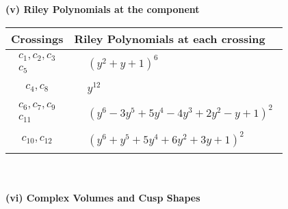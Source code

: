 \documentclass[1p]{elsarticle_modified}
\theoremstyle{definition}
\begin{document}
\newpage\renewcommand{\arraystretch}{1}
\flushleft \textbf{(v) Riley Polynomials at the component}\newline \\
\begin{tabular}{m{50pt}|m{274pt}}
Crossings & \hspace{64pt}Riley Polynomials at each crossing \\
\hline $$\begin{aligned}c_{1},c_{2},c_{3}\\c_{5}\end{aligned}$$&$\begin{aligned}
&(y^2+y+1)^6
\end{aligned}$\\
\hline $$\begin{aligned}c_{4},c_{8}\end{aligned}$$&$\begin{aligned}
&y^{12}
\end{aligned}$\\
\hline $$\begin{aligned}c_{6},c_{7},c_{9}\\c_{11}\end{aligned}$$&$\begin{aligned}
&(y^6-3 y^5+5 y^4-4 y^3+2 y^2- y+1)^2
\end{aligned}$\\
\hline $$\begin{aligned}c_{10},c_{12}\end{aligned}$$&$\begin{aligned}
&(y^6+y^5+5 y^4+6 y^2+3 y+1)^2
\end{aligned}$\\
\hline
\end{tabular}\\~\\
\newpage\flushleft \textbf{(vi) Complex Volumes and Cusp Shapes}
\end{document}

